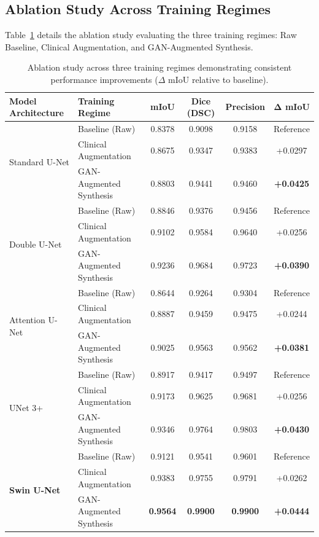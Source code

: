 \documentclass[conference]{IEEEtran}
\begin{document}
\subsection{Ablation Study Across Training Regimes}
Table~\ref{tab:ablation} details the ablation study evaluating the three training regimes: Raw Baseline, Clinical Augmentation, and GAN-Augmented Synthesis.

\begin{table}[t]
\caption{Ablation study across three training regimes demonstrating consistent performance improvements ($\Delta$ mIoU relative to baseline).}
\label{tab:ablation}
\centering
\small
\begin{tabular*}{\textwidth}{@{\extracolsep{\fill}}llcccc@{}}
\toprule
\textbf{Model Architecture} & \textbf{Training Regime} & \textbf{mIoU} & \textbf{Dice (DSC)} & \textbf{Precision} & $\mathbf{\Delta}$ \textbf{mIoU} \\
\midrule
\multirow{3}{*}{Standard U-Net} 
 & Baseline (Raw)          & 0.8378 & 0.9098 & 0.9158 & Reference \\
 & Clinical Augmentation   & 0.8675 & 0.9347 & 0.9383 & +0.0297 \\
 & GAN-Augmented Synthesis & 0.8803 & 0.9441 & 0.9460 & \textbf{+0.0425} \\
\midrule
\multirow{3}{*}{Double U-Net} 
 & Baseline (Raw)          & 0.8846 & 0.9376 & 0.9456 & Reference \\
 & Clinical Augmentation   & 0.9102 & 0.9584 & 0.9640 & +0.0256 \\
 & GAN-Augmented Synthesis & 0.9236 & 0.9684 & 0.9723 & \textbf{+0.0390} \\
\midrule
\multirow{3}{*}{Attention U-Net} 
 & Baseline (Raw)          & 0.8644 & 0.9264 & 0.9304 & Reference \\
 & Clinical Augmentation   & 0.8887 & 0.9459 & 0.9475 & +0.0244 \\
 & GAN-Augmented Synthesis & 0.9025 & 0.9563 & 0.9562 & \textbf{+0.0381} \\
\midrule
\multirow{3}{*}{UNet 3+} 
 & Baseline (Raw)          & 0.8917 & 0.9417 & 0.9497 & Reference \\
 & Clinical Augmentation   & 0.9173 & 0.9625 & 0.9681 & +0.0256 \\
 & GAN-Augmented Synthesis & 0.9346 & 0.9764 & 0.9803 & \textbf{+0.0430} \\
\midrule
\multirow{3}{*}{\textbf{Swin U-Net}} 
 & Baseline (Raw)          & 0.9121 & 0.9541 & 0.9601 & Reference \\
 & Clinical Augmentation   & 0.9383 & 0.9755 & 0.9791 & +0.0262 \\
 & GAN-Augmented Synthesis & \textbf{0.9564} & \textbf{0.9900} & \textbf{0.9900} & \textbf{+0.0444} \\
\bottomrule
\end{tabular*}
\end{table}
\end{document}
